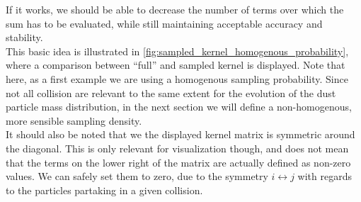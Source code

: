     If it works, we should be able to decrease the number of terms over which the sum has
    to be evaluated, while still maintaining acceptable accuracy and stability. \\







    This basic idea is illustrated in \cref{fig:sampled_kernel_homogenous_probability}, where a 
    comparison between ``full'' and sampled kernel is displayed.
    Note that here, as a first example we are using a homogenous sampling probability.
    Since not all collision are relevant to the same extent for the evolution of the
    dust particle mass distribution, in the next section we will define a non-homogenous,
    more sensible sampling density. \\

    It should also be noted that we the displayed kernel matrix is symmetric around the 
    diagonal. This is only relevant for visualization though, and does not mean that the
    terms on the lower right of the matrix are actually defined as non-zero values.
    We can safely set them to zero, due to the symmetry $i\leftrightarrow j$ with regards
    to the particles partaking in a given collision. 

